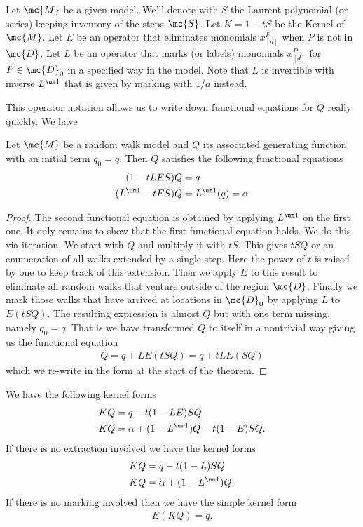 \begin{definition} Let $\mc{M}$ be a given model. We'll denote with $S$ the Laurent polynomial (or series) keeping inventory of the steps $\mc{S}$. Let $K = 1-tS$ be the Kernel of $\mc{M}$. Let $E$ be an operator that eliminates monomials $x_{[d]}^P$ when $P$ is not in $\mc{D}$. Let $L$ be an operator that marks (or labels) monomials $x_{[d]}^P$ for $P \in \mc{D}_0$ in a specified way in the model. Note that $L$ is invertible with inverse $L^{\um 1}$ that is given by marking with $1/a$ instead.
\end{definition}

This operator notation allows us to write down functional equations for $Q$ really quickly. We have
\begin{theorem} Let $\mc{M}$ be a random walk model and $Q$ its associated generating function with an initial term $q_0 = q$. Then $Q$ satisfies the following functional equations
\begin{align}
	(1-tLES)Q &= q\\
	(L^{\um 1}-tES)Q &= L^{\um 1}(q) = \alpha
\end{align}
\end{theorem}
\begin{proof} The second functional equation is obtained by applying $L^{\um 1}$ on the first one. It only remains to show that the first functional equation holds. We do this via iteration. We start with $Q$ and multiply it with $tS$. This gives $tSQ$ or an enumeration of all walks extended by a single step. Here the power of $t$ is raised by one to keep track of this extension. Then we apply $E$ to this result to eliminate all random walks that venture outside of the region $\mc{D}$. Finally we mark those walks that have arrived at locations in $\mc{D}_0$ by applying $L$ to $E(tSQ)$. The resulting expression is almost $Q$ but with one term missing, namely $q_0 = q$. That is we have transformed $Q$ to itself in a nontrivial way giving us the functional equation
\begin{align}
	Q = q + LE(tSQ) = q + tLE(SQ)
\end{align}
which we re-write in the form at the start of the theorem.
\end{proof}
\begin{corollary} We have the following kernel forms
\begin{align}
	KQ &= q - t(1-LE)SQ\\
	KQ &=\alpha + (1-L^{\um 1})Q -t(1-E)SQ.
\end{align}
If there is no extraction involved we have the kernel forms
\begin{align}
	KQ &= q - t(1-L)SQ\\
	KQ &=\alpha + (1-L^{\um 1})Q.
\end{align}
If there is no marking involved then we have the simple kernel form
\begin{align}
	E(KQ) = q.
\end{align}
\end{corollary}
